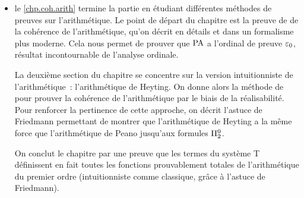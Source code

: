 \begin{itemize}
  Pour cela, on introduit au fur et à mesure des systèmes de types de plus en
  plus forts. On commence par présenter la logique minimale, permettant
  uniquement de typer des termes représentant des fonctions~: cela nous permet
  de donner toutes les bases essentielles pour comprendre la notion de typage.
  Le second système introduit est un système de types avec des produits,
  coproduits, un type vide et un type unité. Ce système est en quelque sorte
  notre système de types central, car il est général et expressif. Finalement,
  on introduit un système de types dont l'intérêt est uniquement de correspondre
  à la déduction naturelle.

  On applique ensuite une méthode de preuve pour la forte normalisation qui est
  presque incontournable pour les systèmes de types~: les candidats de
  réducibilité. Cette méthode consiste à interpréter les types comme des
  ensembles de termes se comportant bien. On donne la méthode précise puis son
  application au $\lambda$-calcul simplement typé, pour finalement donner une
  ébauche de l'adaptation à faire pour obtenir le résultat sur le calcul
  correspondant à la déduction naturelle.

  Enfin, on termine le chapitre par une étude du système T~: ce système de
  calcul, introduit par , peut être vu comme une variant du
  $\lambda$-calcul typé dans lequel on a un type $\intT$ représentant les
  entiers naturel, muni d'un constructeur pour les fonctions récursives.

\item le \cref{chp.coh.arith} termine la partie en étudiant différentes méthodes
  de preuves sur l'arithmétique. Le point de départ du chapitre est la preuve de
   de la cohérence de l'arithmétique, qu'on décrit en détails et
  dans un formalisme plus moderne. Cela nous permet de prouver que $\operatorname{PA}$
  a l'ordinal de preuve $\varepsilon_{0}$, résultat incontournable de l'analyse
  ordinale.

  La deuxième section du chapitre se concentre sur la version intuitionniste de
  l'arithmétique~: l'arithmétique de Heyting. On donne alors la méthode
  de  pour prouver la cohérence de l'arithmétique par le biais de
  la réalisabilité. Pour renforcer la pertinence de cette approche, on décrit
  l'astuce de Friedmann permettant de montrer que l'arithmétique de
  Heyting a la même force que l'arithmétique de Peano jusqu'aux formules
  $\Pi^0_{2}$.

  On conclut le chapitre par une preuve que les termes du système T définissent
  en fait toutes les fonctions prouvablement totales de l'arithmétique du
  premier ordre (intuitionniste comme classique, grâce à l'astuce de
  Friedmann).
\end{itemize}

